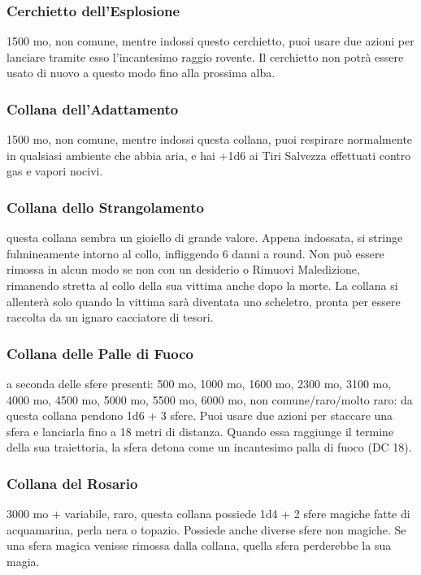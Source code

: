 \begin{multicols}{2}
	\subsubsection*{Cerchietto dell'Esplosione}
	1500 mo, non comune, mentre indossi questo cerchietto, puoi usare due azioni per lanciare tramite esso l'incantesimo raggio rovente. Il cerchietto non potrà essere usato di nuovo a questo modo fino alla prossima alba.


	\subsubsection*{Collana dell'Adattamento}
	1500 mo, non comune, mentre indossi questa collana, puoi respirare normalmente in qualsiasi ambiente che abbia aria, e hai +1d6 ai Tiri Salvezza effettuati contro gas e vapori nocivi.

	\subsubsection*{Collana dello Strangolamento}
	questa collana sembra un gioiello di grande valore. Appena indossata, si stringe fulmineamente intorno al collo, infliggendo 6 danni a round. Non può essere rimossa in alcun modo se non con un desiderio o Rimuovi Maledizione, rimanendo stretta al collo della sua vittima anche dopo la morte. La collana si allenterà solo quando la vittima sarà diventata uno scheletro, pronta per essere raccolta da un ignaro cacciatore di tesori.

	\subsubsection*{Collana delle Palle di Fuoco}
	a seconda delle sfere presenti: 500 mo, 1000 mo, 1600 mo, 2300 mo, 3100 mo, 4000 mo, 4500 mo, 5000 mo, 5500 mo, 6000 mo, non comune/raro/molto raro: da questa collana pendono 1d6 + 3 sfere. Puoi usare due azioni per staccare una sfera e lanciarla fino a 18 metri di distanza. Quando essa raggiunge il termine della sua traiettoria, la sfera detona come un incantesimo palla di fuoco (DC 18).

	\subsubsection*{Collana del Rosario}
	3000 mo + variabile, raro, questa collana possiede 1d4 + 2 sfere magiche fatte di acquamarina, perla nera o topazio. Possiede anche diverse sfere non magiche. Se una sfera magica venisse rimossa dalla collana, quella sfera perderebbe la sua magia.


\end{multicols}

